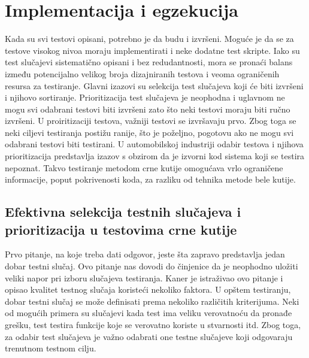 \documentclass[a4paper]{article}
\begin{document}
\section{Implementacija i egzekucija}
\label{sec:implementegzek}

Kada su svi testovi opisani, potrebno je da budu i izvršeni. Moguće je da se za testove visokog nivoa moraju implementirati i neke dodatne test skripte. Iako su test slučajevi sistematično opisani i bez redudantnosti, mora se pronaći balans između potencijalno velikog broja dizajniranih testova i veoma ograničenih resursa za testiranje. Glavni izazovi su selekcija test slučajeva koji će biti izvršeni i njihovo sortiranje. Prioritizacija test slučajeva \cite{ref21}\cite{ref19} je neophodna i uglavnom ne mogu svi odabrani testovi biti izvršeni zato što neki testovi moraju biti ručno izvršeni. U proiritizaciji testova, važniji testovi se izvršavaju prvo. Zbog toga se neki ciljevi testiranja postižu ranije, što je poželjno, pogotovu ako ne mogu svi odabrani testovi biti testirani. U automobilskoj industriji odabir testova i njihova prioritizacija predstavlja izazov s obzirom da je izvorni kod sistema koji se testira nepoznat. Takvo testiranje metodom crne kutije omogućava vrlo ograničene informacije, poput pokrivenosti koda, za razliku od tehnika metode bele kutije.
\bigbreak

\subsection{Efektivna selekcija testnih slučajeva i prioritizacija u testovima crne kutije}
\label{subsec:efektivnaselekcija}

Prvo pitanje, na koje treba dati odgovor, jeste šta zapravo predstavlja jedan dobar testni slučaj. Ovo pitanje nas dovodi do činjenice da je neophodno uložiti veliki napor pri izboru slučajeva testiranja. Kaner \cite{ref22} je istraživao ovo pitanje i opisao kvalitet testnog slučaja koristeći nekoliko faktora. U opštem testiranju, dobar testni slučaj se može definisati prema nekoliko različitih kriterijuma. Neki od mogućih primera su slučajevi kada test ima veliku verovatnoću da pronađe grešku, test testira funkcije koje se verovatno koriste u stvarnosti itd. Zbog toga, za odabir test slučajeva je važno odabrati one testne slučajeve koji odgovaraju trenutnom testnom cilju.
\bigbreak
\end{document}

